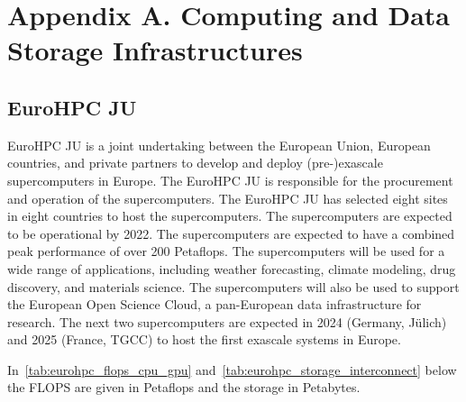 
\clearpage
\appendix
\section*{Appendix A. Computing and Data Storage Infrastructures}
\label{sec:app:architectures}


\subsection*{EuroHPC JU}
\label{sec:arch:eurohpc-ju}

EuroHPC JU is a joint undertaking between the European Union, European countries, and private partners to develop and deploy (pre-)exascale supercomputers in Europe.
The EuroHPC JU is responsible for the procurement and operation of the supercomputers. The EuroHPC JU has selected eight sites in eight countries to host the supercomputers. The supercomputers are expected to be operational by 2022. The supercomputers are expected to have a combined peak performance of over 200 Petaflops. The supercomputers will be used for a wide range of applications, including weather forecasting, climate modeling, drug discovery, and materials science. The supercomputers will also be used to support the European Open Science Cloud, a pan-European data infrastructure for research.
The next two supercomputers are expected in 2024 (Germany, Jülich) and 2025 (France, TGCC) to host the first exascale systems in Europe.

In~\cref{tab:eurohpc_flops_cpu_gpu} and~\cref{tab:eurohpc_storage_interconnect} below the FLOPS are given in Petaflops and the storage in Petabytes.

